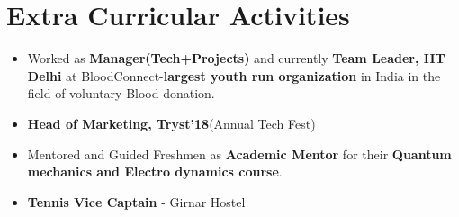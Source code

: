 \documentclass[letterpaper,10pt]{article}
\newcommand{\resumeSubHeadingListStart}{\begin{itemize}[leftmargin=*]}
\newcommand{\resumeSubHeadingListEnd}{\end{itemize}}
\begin{document}
\section{Extra Curricular Activities}
    \resumeSubHeadingListStart
    \item{Worked as \textbf{Manager(Tech+Projects)} and currently \textbf{Team Leader, IIT Delhi} at BloodConnect-\textbf{largest youth run organization} in India in the field of voluntary Blood donation.}
    \item{\textbf{Head of Marketing, Tryst'18}(Annual Tech Fest)}
    \item{Mentored and Guided Freshmen as \textbf{Academic Mentor} for their \textbf{Quantum mechanics and Electro dynamics course}.}
    \item{\textbf{Tennis Vice Captain} - Girnar Hostel}
  \resumeSubHeadingListEnd
\end{document}
